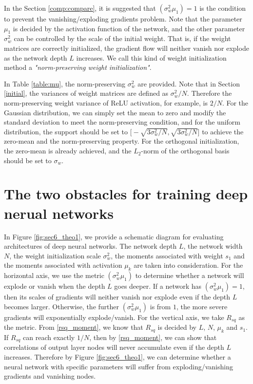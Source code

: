 In the Section \ref{comp:compare}, it is suggested that $(\sigma_w^2\mu_1)=1$ is the condition to
prevent the vanishing/exploding gradients problem. Note that the parameter $\mu_1$ is decided by the 
activation function of the network, and the other parameter $\sigma_w^2$ can be controlled by the
scale of the initial weight. That is, if the weight matrices are correctly initialized, the
gradient flow will neither vanish nor explode as the network depth $L$ increases. We call this kind
of weight initialization method a \textit{"norm-preserving weight initialization"}.

In Table \ref{table:mu}, the norm-preserving $\sigma_w^2$ are provided.
Note that in Section \ref{initial}, the variances of weight matrices are defined as $\sigma_w^2/N$.
Therefore the norm-preserving weight variance of ReLU activation, for example, is $2/N$.
For the Gaussian distribution, we can simply set the mean to zero and modify the standard deviation
to meet the norm-preserving condition, and for the uniform distribution, the support should be set to 
$\Big[-\sqrt{3\sigma_w^2/N}, \sqrt{3\sigma_w^2/N}\Big]$ to achieve the zero-mean and the
norm-preserving property.
For the orthogonal initialization, the zero-mean is already achieved, and the $L_2$-norm of the
orthogonal basis should be set to $\sigma_w$.

\section{The two obstacles for training deep nerual networks} \label{comp:obstacles}


In Figure \ref{fig:sec6_theo1}, we provide a schematic diagram for evaluating architectures
of deep neural networks. The network depth $L$, the network width $N$, the weight initialization scale
$\sigma_w^2$, the moments associated with weight $s_1$ and the moments associated with activation
$\mu_k$ are taken into consideration. For the horizontal axis, we use the metric $(\sigma_w^2\mu_1)$
to determine whether a network will explode or vanish when the depth $L$ goes deeper. If a network has
$(\sigma_w^2\mu_1)=1$, then its scales of gradients will neither vanish nor explode even if the depth
$L$ becomes larger. Otherwise, the further $(\sigma_w^2\mu_1)$ is from $1$, the more severe gradients
will exponentially explode/vanish. For the vertical axis, we take $R_{sq}$ as the metric. From
\eqref{rsq_moment}, we know that $R_{sq}$ is decided by $L$, $N$, $\mu_k$ and $s_1$. If $R_{sq}$ can
reach exactly $1/N$, then by \eqref{rsq_moment}, we can show  that correlations of output layer nodes
will never accumulate even if the depth $L$ increases. Therefore by Figure \ref{fig:sec6_theo1}, we can
determine whether a neural network with specific parameters will suffer from exploding/vanishing
gradients and vanishing nodes.

